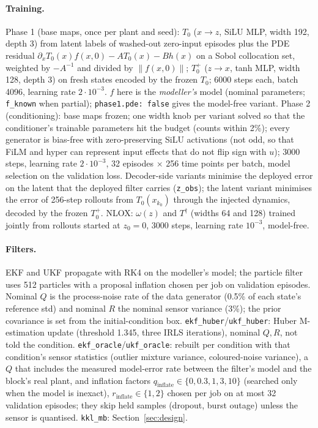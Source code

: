 \paragraph{Training.} Phase 1 (base maps, once per plant and seed): $T_0$ ($x\to z$, SiLU MLP, width 192, depth 3) from latent labels of washed-out zero-input episodes plus the PDE residual $\partial_xT_0(x)f(x,0)-AT_0(x)-Bh(x)$ on a Sobol collocation set, weighted by $-A^{-1}$ and divided by $\|f(x,0)\|$; $T_0^+$ ($z\to x$, tanh MLP, width 128, depth 3) on fresh states encoded by the frozen $T_0$; 6000 steps each, batch 4096, learning rate $2\cdot10^{-3}$. $f$ here is the \emph{modeller's} model (nominal parameters; \texttt{f\_known} when partial); \texttt{phase1.pde: false} gives the model-free variant. Phase 2 (conditioning): base maps frozen; one width knob per variant solved so that the conditioner's trainable parameters hit the budget (counts within 2\%); every generator is bias-free with zero-preserving SiLU activations (not odd, so that FiLM and hyper can represent input effects that do not flip sign with $u$); 3000 steps, learning rate $2\cdot10^{-3}$, 32 episodes $\times$ 256 time points per batch, model selection on the validation loss. Decoder-side variants minimise the deployed error on the latent that the deployed filter carries (\texttt{z\_obs}); the latent variant minimises the error of 256-step rollouts from $T_0(x_{k_0})$ through the injected dynamics, decoded by the frozen $T_0^+$. NLOX: $\omega(z)$ and $T^\dagger$ (widths 64 and 128) trained jointly from rollouts started at $z_0=0$, 3000 steps, learning rate $10^{-3}$, model-free.

\paragraph{Filters.} EKF and UKF propagate with RK4 on the modeller's model; the particle filter uses 512 particles with a proposal inflation chosen per job on validation episodes. Nominal $Q$ is the process-noise rate of the data generator (0.5\% of each state's reference std) and nominal $R$ the nominal sensor variance (3\%); the prior covariance is set from the initial-condition box. \texttt{ekf\_huber}/\texttt{ukf\_huber}: Huber M-estimation update (threshold 1.345, three IRLS iterations), nominal $Q,R$, not told the condition. \texttt{ekf\_oracle}/\texttt{ukf\_oracle}: rebuilt per condition with that condition's sensor statistics (outlier mixture variance, coloured-noise variance), a $Q$ that includes the measured model-error rate between the filter's model and the block's real plant, and inflation factors $q_\mathrm{inflate}\in\{0,0.3,1,3,10\}$ (searched only when the model is inexact), $r_\mathrm{inflate}\in\{1,2\}$ chosen per job on at most 32 validation episodes; they skip held samples (dropout, burst outage) unless the sensor is quantised. \texttt{kkl\_mb}: Section~\ref{sec:design}.


